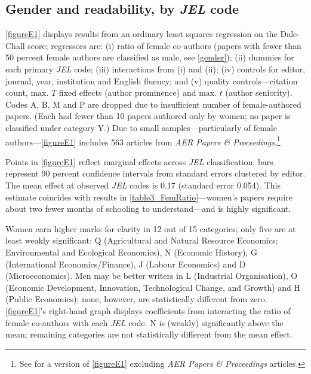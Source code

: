 \begin{appendices}
\begin{refsection}
\subsection{Gender and readability, by \emph{JEL} code}
\label{appendixjel}

\autoref{figureE1} displays results from an ordinary least squares regression on the Dale-Chall score; regressors are: (i) ratio of female co-authors (papers with fewer than 50 percent female authors are classified as male, see \autoref{gender}); (ii) dummies for each primary \emph{JEL} code; (iii) interactions from (i) and (ii); (iv) controls for editor, journal, year, institution and English fluency; and (v) quality controls---citation count, $\text{max. }T$ fixed effects (author prominence) and $\text{max. }t$ (author seniority). Codes A, B, M and P are dropped due to insufficient number of female-authored papers. (Each had fewer than 10 papers authored only by women; no paper is classified under category Y.) Due to small samples---particularly of female authors---\autoref{figureE1} includes 563 articles from \emph{AER Papers \& Proceedings}.\footnote{See  \citet[][pp. 42--43]{Hengel2016} for a version of \autoref{figureE1} excluding \emph{AER Papers \& Proceedings} articles.}



Points in \autoref{figureE1} reflect marginal effects across \emph{JEL} classification; bars represent 90 percent confidence intervals from standard errors clustered by editor. The mean effect at observed \emph{JEL} codes is 0.17 (standard error 0.054). This estimate coincides with results in \autoref{table3_FemRatio}---women's papers require about two fewer months of schooling to understand---and is highly significant.

Women earn higher marks for clarity in 12 out of 15 categories; only five are at least weakly significant: Q (Agricultural and Natural Resource Economics; Environmental and Ecological Economics), N (Economic History), G (International Economics\slash Finance), J (Labour Economics) and D (Microeconomics). Men may be better writers in L (Industrial Organisation), O (Economic Development, Innovation, Technological Change, and Growth) and H (Public Economics); none, however, are statistically different from zero. \autoref{figureE1}'s right-hand graph displays coefficients from interacting the ratio of female co-authors with each \emph{JEL} code. N is (weakly) significantly above the mean; remaining categories are not statistically different from the mean effect.


\end{refsection}
\end{appendices}
